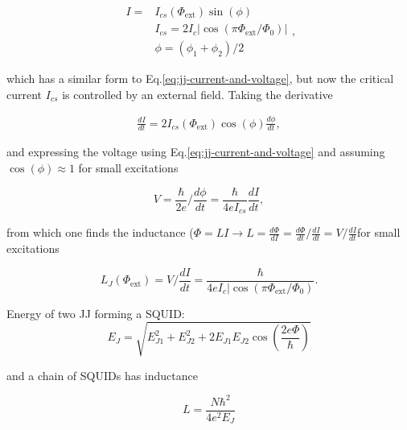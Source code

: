     \begin{equation}
      \begin{aligned}
        I = & I_{cs}(\Phi_\text{ext})\sin(\phi)\\
        & I_{cs} = 2I_c|\cos(\pi\Phi_\text{ext}/\Phi_0)|\\
        & \phi = (\phi_1+\phi_2)/2
      \end{aligned},
    \end{equation}

    \noindent      which     has      a      similar     form      to
    Eq.\eqref{eq:jj-current-and-voltage},   but   now  the   critical
    current $I_{cs}$ is  controlled by an external  field. Taking the
    derivative

    \begin{equation}
      \begin{aligned}
        \frac{dI}{dt}=2I_{cs}(\Phi_\text{ext})\cos(\phi)\frac{d\phi}{dt},
      \end{aligned}
    \end{equation}

    \noindent      and     expressing      the     voltage      using
    Eq.\eqref{eq:jj-current-and-voltage}         and         assuming
    $\cos(\phi)\approx1$ for small excitations

    \begin{equation}
      V = \frac{\hbar}{2e}/\frac{d\phi}{dt} = \frac{\hbar}{4eI_{cs}}\frac{dI}{dt},
    \end{equation}

    \noindent    from     which    one    finds     the    inductance
    ($\Phi     =     LI     \rightarrow      L     =     \frac{d\Phi}{dI}     =
    \frac{d\Phi}{dt}/\frac{dI}{dt}   =    V/\frac{dI}{dt}$for   small
    excitations

    \begin{equation}
      L_J(\Phi_\text{ext}) = V/\frac{dI}{dt} = \frac{\hbar}{4eI_c|\cos(\pi\Phi_\text{ext}/\Phi_0)}.
    \end{equation}
    \vspace{6ex}

    \begin{framed}\noindent
      Energy of two JJ forming a SQUID:
      \begin{equation}
        E_{J} = \sqrt{E_{J1}^2 + E_{J2}^2 + 2E_{J1}E_{J2}\cos\left( \frac{2e\Phi}{\hbar} \right)}
      \end{equation}

      \noindent and a chain of SQUIDs has inductance

      \begin{equation}
        L = \frac{N\hbar^{2}}{4e^2E_J}
      \end{equation}

      \noindent \textbf{}
    \end{framed}

